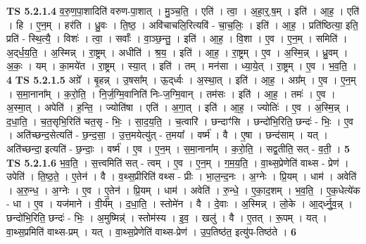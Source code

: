 \documentclass[17pt]{extarticle}
\begin{document}
                  \newline
                                \textbf{ TS 5.2.1.4} \newline
                  व॒रु॒ण॒पा॒शादिति॑ वरुण-पा॒शात् । मु॒ञ्च॒ति॒ । एति॑ । त्वा॒ । अ॒हा॒र्॒.ष॒म् । इति॑ । आ॒ह॒ । एति॑ । हि । ए॒न॒म् । हर॑ति । ध्रु॒वः । ति॒ष्ठ॒ । अवि॑चाचलि॒रित्यवि॑ - चा॒च॒लिः॒ । इति॑ । आ॒ह॒ । प्रति॑ष्ठित्या॒ इति॒ प्रति॑ - स्थि॒त्यै॒ । विशः॑ । त्वा॒ । सर्वाः᳚ । वा॒ञ्छ॒न्तु॒ । इति॑ । आ॒ह॒ । वि॒शा । ए॒व । ए॒न॒म् । समिति॑ । अ॒द्‌र्ध॒य॒ति॒ । अ॒स्मिन्न् । रा॒ष्ट्रम् । अधीति॑ । श्र॒य॒ । इति॑ । आ॒ह॒ । रा॒ष्ट्रम् । ए॒व । अ॒स्मि॒न्न् । ध्रु॒वम् । अ॒कः॒ । यम् । का॒मये॑त । रा॒ष्ट्रम् । स्या॒त् । इति॑ । तम् । मन॑सा । ध्या॒ये॒त् । रा॒ष्ट्रम् । ए॒व । भ॒व॒ति॒ । \textbf{  4} \newline
                  \newline
                                \textbf{ TS 5.2.1.5} \newline
                  अग्रे᳚ । बृ॒हन्न् । उ॒षसा᳚म् । ऊ॒द्‌र्ध्वः । अ॒स्था॒त् । इति॑ । आ॒ह॒ । अग्र᳚म् । ए॒व । ए॒न॒म् । स॒मा॒नाना᳚म् । क॒रो॒ति॒ । नि॒र्ज॒ग्मि॒वानिति॑ निः-ज॒ग्मि॒वान् । तम॑सः । इति॑ । आ॒ह॒ । तमः॑ । ए॒व । अ॒स्मा॒त् । अपेति॑ । ह॒न्ति॒ । ज्योति॑षा । एति॑ । अ॒गा॒त् । इति॑ । आ॒ह॒ । ज्योतिः॑ । ए॒व । अ॒स्मि॒न्न् । द॒धा॒ति॒ । च॒त॒सृभि॒रिति॑ चत॒सृ - भिः॒ । सा॒द॒य॒ति॒ । च॒त्वारि॑ । छन्दाꣳ॑सि । छन्दो॑भि॒रिति॒ छन्दः॑ - भिः॒ । ए॒व । अति॑च्छन्द॒सेत्यति॑ - छ॒न्द॒सा॒ । उ॒त्त॒मयेत्यु॑त् - त॒मया᳚ । वर्ष्म॑ । वै । ए॒षा । छन्द॑साम् । यत् । अति॑च्छन्दा॒ इत्यति॑ - छ॒न्दाः॒ । वर्ष्म॑ । ए॒व । ए॒न॒म् । स॒मा॒नाना᳚म् । क॒रो॒ति॒ । सद्व॒तीति॒ सत् - व॒ती॒ । \textbf{  5} \newline
                  \newline
                                \textbf{ TS 5.2.1.6} \newline
                  भ॒व॒ति॒ । स॒त्त्वमिति॑ सत् - त्वम् । ए॒व । ए॒न॒म् । ग॒म॒य॒ति॒ । वा॒थ्स॒प्रेणेति॑ वाथ्स - प्रेण॑ । उपेति॑ । ति॒ष्ठ॒ते॒ । ए॒तेन॑ । वै । व॒थ्स॒प्रीरिति॑ वथ्स - प्रीः । भा॒ल॒न्द॒नः । अ॒ग्नेः । प्रि॒यम् । धाम॑ । अवेति॑ । अ॒रु॒न्ध॒ । अ॒ग्नेः । ए॒व । ए॒तेन॑ । प्रि॒यम् । धाम॑ । अवेति॑ । रु॒न्धे॒ । ए॒का॒द॒शम् । भ॒व॒ति॒ । ए॒क॒धेत्ये॑क - धा । ए॒व । यज॑माने । वी॒र्य᳚म् । द॒धा॒ति॒ । स्तोमे॑न । वै । दे॒वाः । अ॒स्मिन्न् । लो॒के । आ॒द्‌र्ध्नु॒व॒न्न् । छन्दो॑भि॒रिति॒ छन्दः॑ - भिः॒ । अ॒मुष्मिन्न्॑ । स्तोम॑स्य । इ॒व॒ । खलु॑ । वै । ए॒तत् । रू॒पम् । यत् । वा॒थ्स॒प्रमिति॑ वाथ्स-प्रम् । यत् । वा॒थ्स॒प्रेणेति॑ वाथ्स-प्रेण॑ । उ॒प॒तिष्ठ॑त॒ इत्यु॑प-तिष्ठ॑ते । \textbf{  6} \newline
                  \newline
\end{document}
